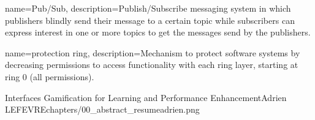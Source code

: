 



{
    name=Pub/Sub,
    description={Publish/Subscribe messaging system in which publishers blindly send their message to a certain topic while subscribers can express interest in one or more topics to get the messages send by the publishers.}
}

{
    name=protection ring,
    description={Mechanism to protect software systems by decreasing permissions to access functionality with each ring layer, starting at ring 0 (all permissions).}
}


\begin{thesis}{Interfaces Gamification for Learning and Performance Enhancement}{Adrien LEFEVRE}{chapters/00_abstract_resume}{adrien.png}{}
    
    
    
    
    
\end{thesis}
